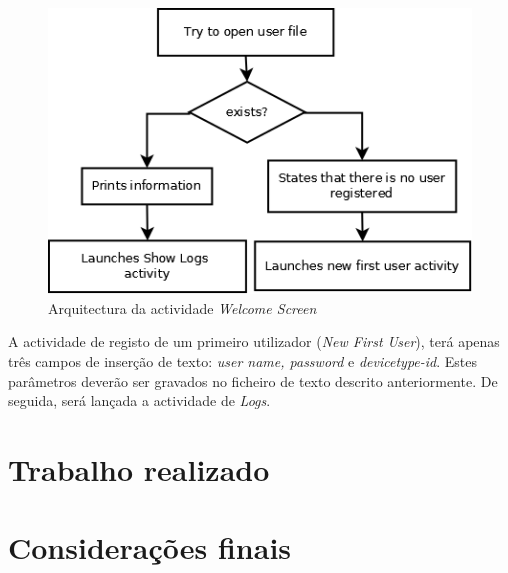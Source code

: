 \documentclass[a4paper]{article}
\begin{document}
\begin{figure}[hb]
  \centering
  \includegraphics[scale=0.40]{WelcomeScreen.png}
  \caption{Arquitectura da actividade \textit{Welcome Screen}}
  \label{fig:app_welcome}
\end{figure}

A actividade de registo de um primeiro utilizador (\textit{New First User}), terá apenas três campos de inserção de texto: \textit{user name, password} e \textit{devicetype-id}. Estes parâmetros deverão ser gravados no ficheiro de texto descrito anteriormente. De seguida, será lançada a actividade de \textit{Logs}.




\section{Trabalho realizado}
\section{Considerações finais}
\end{document}
